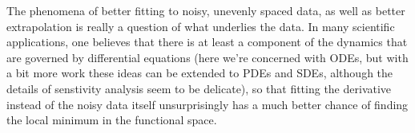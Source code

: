 \documentclass{amsart}
\begin{document}
\indent The phenomena of better fitting to noisy, unevenly spaced data, as well as better extrapolation is really a question of what underlies the data. In many scientific applications, one believes that there is at least a component of the dynamics that are governed by differential equations (here we're concerned with ODEs, but with a bit more work these ideas can be extended to PDEs and SDEs, although the details of senstivity analysis seem to be delicate), so that fitting the derivative instead of the noisy data itself unsurprisingly has a much better chance of finding the local minimum in the functional space.
\end{document}
